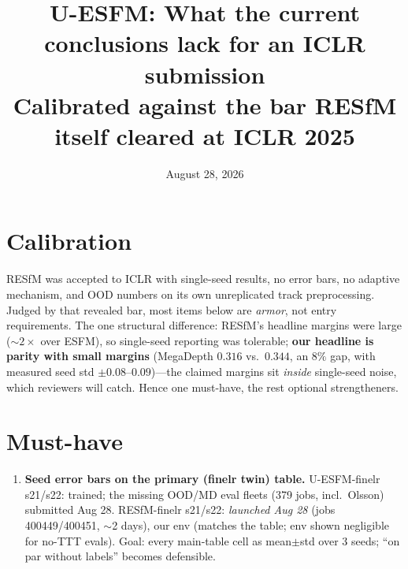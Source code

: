 \documentclass[10pt]{article}
\title{U-ESFM: What the current conclusions lack for an ICLR submission\\
\large Calibrated against the bar RESfM itself cleared at ICLR 2025}
\author{}
\date{August 28, 2026}
\begin{document}
\maketitle

\section*{Calibration}
RESfM was accepted to ICLR with single-seed results, no error bars, no adaptive mechanism,
and OOD numbers on its own unreplicated track preprocessing. Judged by that revealed bar,
most items below are \emph{armor}, not entry requirements. The one structural difference:
RESfM's headline margins were large ($\sim\!2\times$ over ESFM), so single-seed reporting
was tolerable; \textbf{our headline is parity with small margins} (MegaDepth $0.316$ vs.\
$0.344$, an $8\%$ gap, with measured seed std $\pm 0.08$--$0.09$)---the claimed margins sit
\emph{inside} single-seed noise, which reviewers will catch. Hence one must-have, the
rest optional strengtheners.

\section*{Must-have}
\begin{enumerate}[leftmargin=1.4em]
\item \textbf{Seed error bars on the primary (finelr twin) table.} U-ESFM-finelr s21/s22:
trained; the missing OOD/MD eval fleets (379 jobs, incl.\ Olsson) submitted Aug 28.
RESfM-finelr s21/s22: \emph{launched Aug 28} (jobs 400449/400451, $\sim$2 days), our env
(matches the table; env shown negligible for no-TTT evals). Goal: every main-table cell as
mean$\pm$std over 3 seeds; ``on par without labels'' becomes defensible.
\end{enumerate}
\end{document}
